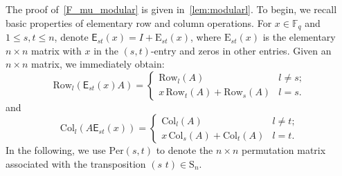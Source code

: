 \documentclass[12pt,a4paper,reqno]{amsart}
\theoremstyle{plain}
\theoremstyle{definition}
\newcommand{\FF}{{\mathbb{F}}}
\newcommand{\1}{\mathds{1}}
\newcommand{\E}{\mathrm{E}}
\newcommand{\EE}{\mathsf{E}}
\begin{document}
The proof of~\cref{F_mu_modular} is given in~\cref{lem:modularl}.  To begin, we recall basic properties of elementary row and column operations. For $x\in \FF_q$ and $1\leq s,t\leq n$, denote $\EE_{st}(x)=I+\E_{st}(x)$, where  $\E_{st}(x)$ is the elementary $n\times n$ matrix with $x$ in the $(s,t)$-entry  and zeros in other entries. Given an $n \times n$ matrix, we immediately obtain:
\begin{equation}
\label{elementary_oper}
\mathrm{Row}_l(\EE_{st}(x)A) = \begin{cases} \mathrm{Row}_l(A) & l \neq s; \\ x \,\mathrm{Row}_t(A) + \mathrm{Row}_s(A) & l = s. \end{cases}
\end{equation}
and \[
\mathrm{Col}_l(A\EE_{st}(x)) = \begin{cases} \mathrm{Col}_l(A) & l \neq t; \\ x \,\mathrm{Col}_s(A) + \mathrm{Col}_t(A) & l = t. \end{cases}
\]
In the following, we use $\mathrm{Per}(s,t)$ to denote 
the $n\times n$ permutation matrix associated with the transposition $(s\,\, t)\in \mathrm{S}_n$.
\end{document}
